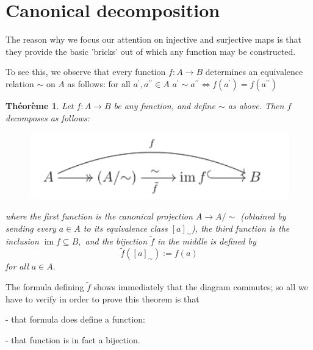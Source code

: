 \documentclass[12pt]{book}
\theoremstyle{definition}\newtheorem{dfn}{Définition}[chapter]
\theoremstyle{plain}\newtheorem{thm}{Théorème}[chapter]
\theoremstyle{plain}\newtheorem{prp}{Proposition}[chapter]
\theoremstyle{plain}\newtheorem{lem}{\bf Lemme}[chapter]
\theoremstyle{plain}\newtheorem{axm}{\bf Axiome}[chapter]
\theoremstyle{plain}\newtheorem{lmm}{\bf Lemme}[chapter]
\theoremstyle{plain}\newtheorem{exm}{\bf Example}[chapter]
\theoremstyle{plain}\newtheorem{cor}{\bf Corollaire}[chapter]
\theoremstyle{remark}\newtheorem{rem}{Remarque}[chapter]
\begin{document}
\section{Canonical decomposition} 

The reason why we focus our attention on injective and surjective maps is that they provide the basic 'bricks' out of which any function may be constructed.

To see this, we observe that every function $f: A \rightarrow B$ determines an equivalence relation $\sim$ on $A$ as follows: for all $a^{\prime}, a^{\prime \prime} \in A$
$a^{\prime} \sim a^{\prime \prime} \Longleftrightarrow f\left(a^{\prime}\right)=f\left(a^{\prime \prime}\right)$

\begin{thm}\label{t1}
Let $f: A \rightarrow B$ be any function, and define $\sim$ as above. Then $f$ decomposes as follows:
\begin{figure}[H]\centering\includegraphics[width=1\textwidth]{image//Vocabulaire de theorie des ensembles//5}\end{figure}
where the first function is the canonical projection $A \rightarrow A / \sim$ (obtained by sending every $a \in A$ to its equivalence class $[a]_{\sim}$), the third function is the inclusion $\operatorname{im} f \subseteq B,$ and the bijection $\tilde{f}$ in the middle is defined by
$$
\tilde{f}\left([a]_{\sim}\right):=f(a)
$$
for all $a \in A.$
\end{thm}
The formula defining $\tilde{f}$ shows immediately that the diagram commutes; so all we have to verify in order to prove this theorem is that

- that formula does define a function:

- that function is in fact a bijection.
\end{document}
